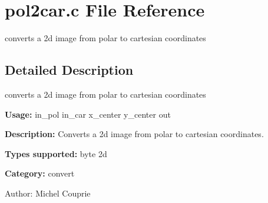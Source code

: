 \section{pol2car.c File Reference}
\label{pol2car_8c}
converts a 2d image from polar to cartesian coordinates  




\label{_details}
\subsection{Detailed Description}
converts a 2d image from polar to cartesian coordinates 

{\bf Usage:} in\_\-pol in\_\-car x\_\-center y\_\-center out

{\bf Description:} Converts a 2d image from polar to cartesian coordinates.

{\bf Types supported:} byte 2d

{\bf Category:} convert

\begin{Desc}
\item[Author:]Michel Couprie \end{Desc}
